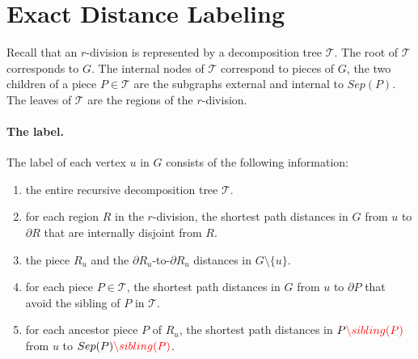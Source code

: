 \documentclass[11pt]{article}
\theoremstyle{plain}
\newcommand{\TG}{\mathcal{T}}
\newcommand{\out}[1]{#1^{out}}
\begin{document}


\section{Exact Distance Labeling}\label{sec:exact}

Recall that an $r$-division is represented by a decomposition tree $\TG$. The root of $\TG$ corresponds to $G$. The internal   nodes of $\TG$ correspond to pieces of $G$, the two children of a piece $P\in \TG$ are the subgraphs external and internal to $Sep(P)$. The leaves of $\TG$ are the regions of the $r$-division.  

\paragraph{The label.}
The label of each vertex $u$ in $G$ consists of the following information:
\begin{enumerate}[label=(\roman*)]
\item \label{item1} the entire recursive decomposition tree $\TG$. 
\item \label{item2} for each region $R$ in the $r$-division, the shortest path distances in $G$ from $u$ to $\partial R$ that are internally disjoint from $R$. 
\item \label{item3} the piece $R_u$ and the $\partial R_u$-to-$\partial R_u$ distances in $G\setminus\{u\}$.
\item \label{item4} for each piece $P \in \TG$, the shortest path distances in $G$ from $u$ to $\partial P$ that  avoid the sibling of $P$ in $\TG$.
\item \label{item5} for each ancestor piece $P$ of $R_u$, the shortest path distances in $P{\color{red}\setminus sibling(P)}$ from $u$ to $Sep(P){\color{red}\setminus sibling(P)}$. 
\end{enumerate}
 
\end{document}
